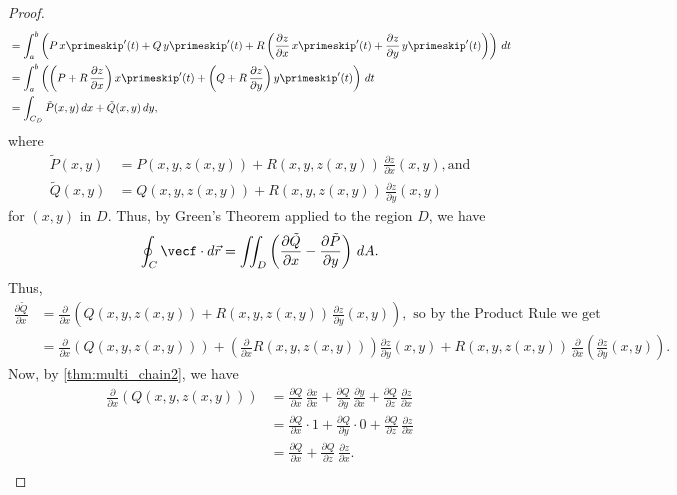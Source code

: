 \begin{proof}
\begin{align*}
   &= \int_a^b \left( P\,x\primeskip'(t) + Q\,y\primeskip'(t) +
    R\left( \frac{\partial z}{\partial x}\,x\primeskip'(t) + \frac{\partial z}{\partial y}\,y\primeskip'(t)
    \right) \right)\,dt\\
   &= \int_a^b \left( \left( P+R\,\frac{\partial z}{\partial x} \right) x\primeskip'(t) +
    \left( Q+R\,\frac{\partial z}{\partial y} \right) y\primeskip'(t) \right)\,dt\\
   &= \int_{C_D} \tilde{P}(x,y)\,dx + \tilde{Q}(x,y)\,dy ,
 \end{align*}
 where
 \begin{align*}
  \tilde{P}(x,y) &= P(x,y,z(x,y)) + R(x,y,z(x,y))\,\frac{\partial z}{\partial x}(x,y),\text{and}\\
  \tilde{Q}(x,y) &= Q(x,y,z(x,y)) + R(x,y,z(x,y))\,\frac{\partial z}{\partial y}(x,y)
 \end{align*}
 for $(x,y)$ in $D$. Thus, by Green's Theorem applied to the region $D$, we have
 \begin{equation}\label{eqn:stokesproof}
  \oint_C\vecf\cdot d\vec{r} = \iint_{D} \left( \frac{\partial \tilde{Q}}{\partial x} -
   \frac{\partial \tilde{P}}{\partial y} \right)\,dA .
 \end{equation}
 Thus,
 \begin{align*}
  \frac{\partial \tilde{Q}}{\partial x} &= \frac{\partial}{\partial x} \left( Q(x,y,z(x,y)) +
   R(x,y,z(x,y))\,\frac{\partial z}{\partial y}(x,y) \right) ,\text{ so by the Product Rule we get}\\
   &= \frac{\partial}{\partial x} \left( Q(x,y,z(x,y)) \right) + \left( \frac{\partial}{\partial x} R(x,y,z(x,y))
   \right) \frac{\partial z}{\partial y}(x,y) + R(x,y,z(x,y))\,\frac{\partial}{\partial x} \left(
   \frac{\partial z}{\partial y}(x,y) \right) .
 \end{align*}
 Now, by \autoref{thm:multi_chain2}, we have
 \begin{align*}
  \frac{\partial}{\partial x} \left( Q(x,y,z(x,y)) \right) &=
   \frac{\partial Q}{\partial x}\,\frac{\partial x}{\partial x} +
   \frac{\partial Q}{\partial y}\,\frac{\partial y}{\partial x} +
   \frac{\partial Q}{\partial z}\,\frac{\partial z}{\partial x}\\
   &= \frac{\partial Q}{\partial x} \cdot 1 + \frac{\partial Q}{\partial y} \cdot 0 + \frac{\partial Q}{\partial z}\,
    \frac{\partial z}{\partial x}\\
   &= \frac{\partial Q}{\partial x} + \frac{\partial Q}{\partial z}\,\frac{\partial z}{\partial x} .\\

\end{align*}
\end{proof}
